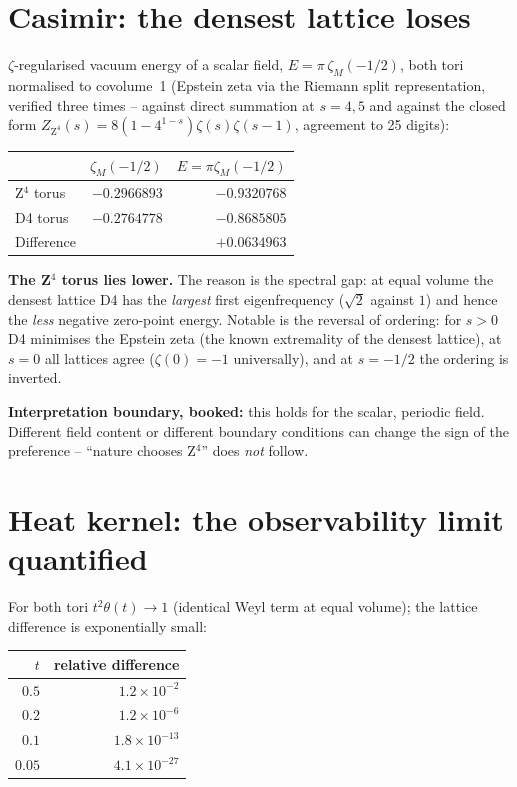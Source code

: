 \documentclass[11pt]{report}
\begin{document}
\section{Casimir: the densest lattice loses}

$\zeta$-regularised vacuum energy of a scalar field,
$E = \pi\,\zeta_M(-1/2)$, both tori normalised to covolume~1
(Epstein zeta via the Riemann split representation, verified three
times -- against direct summation at $s = 4, 5$ and against the
closed form
$Z_{\text{Z}^4}(s) = 8(1-4^{1-s})\zeta(s)\zeta(s-1)$, agreement to
25 digits):

\begin{center}
\begin{tabular}{lrr}
\toprule
 & $\zeta_M(-1/2)$ & $E = \pi\zeta_M(-1/2)$ \\
\midrule
Z$^4$ torus & $-0.2966893$ & $-0.9320768$ \\
D4 torus & $-0.2764778$ & $-0.8685805$ \\
\midrule
Difference & & $+0.0634963$ \\
\bottomrule
\end{tabular}
\end{center}

\textbf{The Z$^4$ torus lies lower.} The reason is the spectral gap:
at equal volume the densest lattice D4 has the \emph{largest} first
eigenfrequency ($\sqrt2$ against $1$) and hence the \emph{less}
negative zero-point energy. Notable is the reversal of ordering: for
$s > 0$ D4 minimises the Epstein zeta (the known extremality of the
densest lattice), at $s = 0$ all lattices agree
($\zeta(0) = -1$ universally), and at $s = -1/2$ the ordering is
inverted.

\textbf{Interpretation boundary, booked:} this holds for the scalar,
periodic field. Different field content or different boundary
conditions can change the sign of the preference --
\enquote{nature chooses Z$^4$} does \emph{not} follow.

\section{Heat kernel: the observability limit quantified}

For both tori $t^2\theta(t) \to 1$ (identical Weyl term at equal
volume); the lattice difference is exponentially small:

\begin{center}
\begin{tabular}{rr}
\toprule
$t$ & relative difference \\
\midrule
$0.5$ & $1.2\times10^{-2}$ \\
$0.2$ & $1.2\times10^{-6}$ \\
$0.1$ & $1.8\times10^{-13}$ \\
$0.05$ & $4.1\times10^{-27}$ \\
\bottomrule
\end{tabular}
\end{center}
\end{document}
